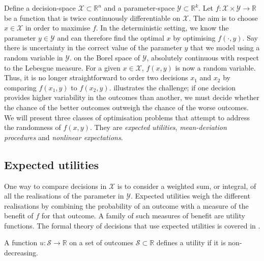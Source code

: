 \documentclass[main.tex]{subfiles}
\begin{document}
Define a decision-space $\mathcal{X}\subset \mathbb{R}^n$ and a
parameter-space $\mathcal{Y}\subset \mathbb{R}^k$.
Let $f:\mathcal{X}\times\mathcal{Y}\to\mathbb{R}$ be a function that
is twice continuously differentiable on $\mathcal{X}$.
The aim is to choose $x\in\mathcal{X}$ in order to maximise $f$.
In the deterministic setting, we know the parameter
$y\in\mathcal{Y}$ and can therefore find the optimal $x$ by optimising
$f(\cdot,y)$.
Say there is uncertainty in the correct value of the parameter $y$ that
we model using a random variable in $\mathcal{Y}$.
on the Borel space of $\mathcal{Y}$, absolutely continuous with respect
to the Lebesgue measure.
For a given $x\in\mathcal{X}$, $f(x,y)$ is now a random variable.
Thus, it is no longer straightforward to order two decisions $x_1$ and
$x_2$ by comparing $f(x_1,y)$ to $f(x_2,y)$.
 illustrates the challenge;
if one decision provides higher variability in the outcomes than
another, we must decide whether the chance of the better outcomes
outweigh the chance of the worse outcomes.
We will present three classes of optimisation problems that attempt to
address the randomness of $f(x,y)$. They are \emph{expected
  utilities}, \emph{mean-deviation procedures} and \emph{nonlinear
  expectations}.

\subsection{Expected utilities}
One way to compare decisions in $\mathcal{X}$ is to consider a weighted
sum, or integral, of all the realisations of the parameter in $\mathcal{Y}$.
Expected utilities weigh the different realisations by combining the
probability of an outcome with a measure of the benefit of $f$ for that
outcome.
A family of such measures of benefit are utility functions. The formal
theory of decisions that use expected utilities is covered in
\citet[Ch.~2]{follmer2004stochastic}.
\begin{mydef}
  A function $u:\mathcal{S}\to\mathbb{R}$ on a set of outcomes
  $\mathcal{S}\subset \mathbb{R}$ defines a utility if
  it is non-decreasing.
\end{mydef}
\end{document}
